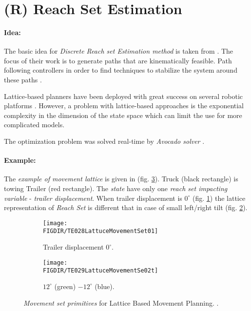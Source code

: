 \section{(R) Reach Set Estimation}\label{s:ReachSetEstimationTheory}
\paragraph{Idea:} The basic idea for \emph{Discrete Reach set Estimation  method} is taken from \cite{ljungqvist2017lattice}. The focus of their work is to generate paths that are kinematically feasible. Path following controllers in order to find techniques to stabilize the system around these paths \cite{ljungqvist2016path,evestedt2016path}. 

Lattice-based planners have been deployed with great success on several robotic platforms \cite{pivtoraiko2009differentially,urmson2008william,cirillo2017videogames,tomlin2000game,chen1997game}. However, a problem with lattice-based approaches is the exponential complexity in the dimension of the state space which can limit the use for more complicated models.

The optimization problem was solved real-time by \emph{Avocado solver} \cite{houska2011acado}.

\paragraph{Example:} The \emph{example of movement lattice} is given in (fig. \ref{fig:latticeMovementPrimitivesExample}). Truck (black rectangle) is towing Trailer (red rectangle). The \emph{state} have only one \emph{reach set impacting variable} - \emph{trailer displacement}. When trailer displacement is $0^{\circ}$ (fig. \ref{fig:noDisplacementLattuce}) the lattice representation of \emph{Reach Set} is different that in case of small left/right tilt (fig. \ref{fig:displacementleftrightlattuce}).

\begin{figure}[H]
    \centering
    \begin{subfigure}{0.48\textwidth}
        \centering
        \texttt{[image: \\FIGDIR/TE028LattuceMovementSet01]}
        \caption{Trailer displacement $0^{\circ}$.}
        \label{fig:noDisplacementLattuce}
    \end{subfigure}
    \begin{subfigure}{0.48\textwidth}
        \centering
        \texttt{[image: \\FIGDIR/TE029LattuceMovementSe02t]} 
        \caption{$12^{\circ}$ (green) $-12^{\circ}$ (blue).}
        \label{fig:displacementleftrightlattuce}
    \end{subfigure}
    
    \caption{\emph{Movement set primitives} for Lattice Based Movement Planning. \cite{ljungqvist2017lattice}. }
    \label{fig:latticeMovementPrimitivesExample}
\end{figure}

